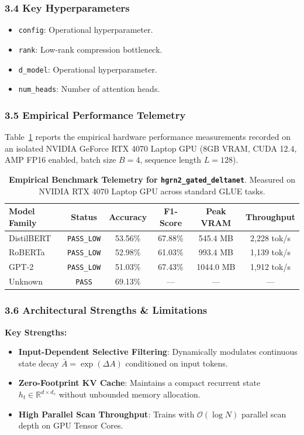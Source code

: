 \subsubsection*{3.4 Key Hyperparameters}
\begin{itemize}
    \item \texttt{config}: Operational hyperparameter.
    \item \texttt{rank}: Low-rank compression bottleneck.
    \item \texttt{d\_model}: Operational hyperparameter.
    \item \texttt{num\_heads}: Number of attention heads.
\end{itemize}

\subsubsection*{3.5 Empirical Performance Telemetry}
Table~\ref{tab:telemetry_hgrn2_gated_deltanet} reports the empirical hardware performance measurements recorded on an isolated NVIDIA GeForce RTX 4070 Laptop GPU (8GB VRAM, CUDA 12.4, AMP FP16 enabled, batch size $B=4$, sequence length $L=128$).

\begin{table}[h]
\centering
\small
\caption{\textbf{Empirical Benchmark Telemetry for \texttt{hgrn2\_gated\_deltanet}}. Measured on NVIDIA RTX 4070 Laptop GPU across standard GLUE tasks.}
\label{tab:telemetry_hgrn2_gated_deltanet}
\begin{tabular*}{\columnwidth}{@{\extracolsep{\fill}}lccccc}
\toprule
\textbf{Model Family} & \textbf{Status} & \textbf{Accuracy} & \textbf{F1-Score} & \textbf{Peak VRAM} & \textbf{Throughput} \\
\midrule
DistilBERT & \texttt{PASS\_LOW} & 53.56\% & 67.88\% & 545.4 MB & 2,228 tok/s \\
RoBERTa & \texttt{PASS\_LOW} & 52.98\% & 61.03\% & 993.4 MB & 1,139 tok/s \\
GPT-2 & \texttt{PASS\_LOW} & 51.03\% & 67.43\% & 1044.0 MB & 1,912 tok/s \\
Unknown & \texttt{PASS} & 69.13\% & --- & --- & --- \\
\bottomrule
\end{tabular*}
\end{table}

\subsubsection*{3.6 Architectural Strengths \& Limitations}
\textbf{Key Strengths:}
\begin{itemize}
    \item \textbf{Input-Dependent Selective Filtering}: Dynamically modulates continuous state decay $\bar{A} = \exp(\Delta A)$ conditioned on input tokens.
    \item \textbf{Zero-Footprint KV Cache}: Maintains a compact recurrent state $h_t \in \mathbb{R}^{d \times d_s}$ without unbounded memory allocation.
    \item \textbf{High Parallel Scan Throughput}: Trains with $\mathcal{O}(\log N)$ parallel scan depth on GPU Tensor Cores.
\end{itemize}

